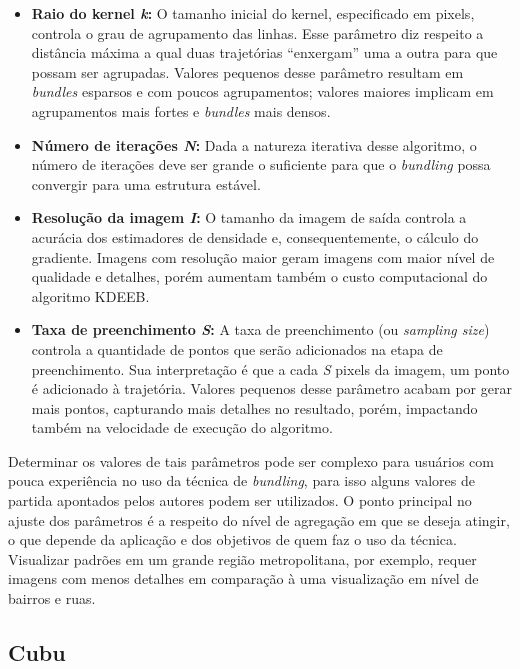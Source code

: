 \begin{itemize}

\item{\textbf{Raio do kernel \emph{k}:}} O tamanho inicial do kernel, especificado em
pixels, controla o grau de agrupamento das linhas. Esse parâmetro diz respeito a
distância máxima a qual duas trajetórias ``enxergam'' uma a outra para que
possam ser agrupadas. Valores pequenos desse parâmetro resultam em
\emph{bundles} esparsos e com poucos agrupamentos; valores maiores implicam em
agrupamentos mais fortes e \emph{bundles} mais densos.

\item{\textbf{Número de iterações \emph{N}:}} Dada a natureza iterativa desse
algoritmo, o número de iterações deve ser grande o suficiente para que o
\emph{bundling} possa convergir para uma estrutura estável.

\item{\textbf{Resolução da imagem \emph{I}:}} O tamanho da imagem de saída controla a
acurácia dos estimadores de densidade e, consequentemente, o cálculo do
gradiente. Imagens com resolução maior geram imagens com maior nível de
qualidade e detalhes, porém aumentam também o custo computacional do algoritmo KDEEB.

\item{\textbf{Taxa de preenchimento \emph{S}:}} A taxa de preenchimento (ou \emph{sampling size})
controla a quantidade de pontos que serão adicionados na etapa de preenchimento.
Sua interpretação é que a cada \emph{S} pixels da imagem, um
ponto é adicionado à trajetória. Valores pequenos desse parâmetro acabam
por gerar mais pontos, capturando mais detalhes no
resultado, porém, impactando também na velocidade de execução do algoritmo.

\end{itemize}

Determinar os valores de tais parâmetros pode ser complexo para usuários com
pouca experiência no uso da técnica de \emph{bundling}, para isso alguns
valores de partida apontados pelos autores podem ser utilizados. O ponto
principal no ajuste dos parâmetros é a respeito do nível de
agregação em que se deseja atingir, o que depende da aplicação e dos
objetivos de quem faz o uso da técnica. Visualizar padrões em um grande
região metropolitana, por exemplo, requer imagens com menos detalhes em
comparação à uma visualização em nível de bairros e ruas.

\subsection{Cubu}

